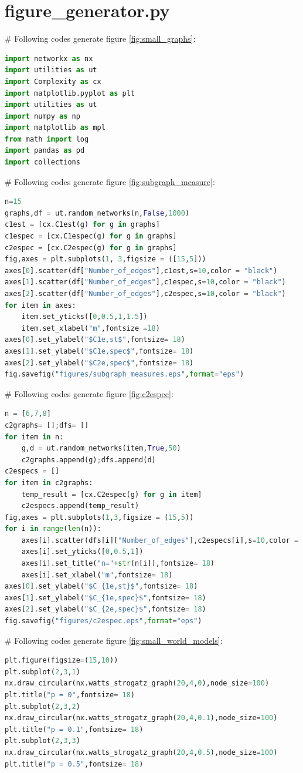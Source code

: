 \documentclass[12pt]{article}
\begin{document}
{\section{figure\_generator.py}
\label{figure_generator}
\# Following codes generate figure \ref{fig:small_graphs}:
\begin{lstlisting}[breaklines=true,language=Python]
import networkx as nx
import utilities as ut
import Complexity as cx
import matplotlib.pyplot as plt
import utilities as ut
import numpy as np
import matplotlib as mpl
from math import log
import pandas as pd
import collections
\end{lstlisting}
\noindent
\newline
\# Following codes generate figure \ref{fig:subgraph_measure}:
\begin{lstlisting}[breaklines=true,language=Python]
n=15
graphs,df = ut.random_networks(n,False,1000)
c1est = [cx.C1est(g) for g in graphs]
c1espec = [cx.C1espec(g) for g in graphs]
c2espec = [cx.C2espec(g) for g in graphs]
fig,axes = plt.subplots(1, 3,figsize = ([15,5]))
axes[0].scatter(df["Number_of_edges"],c1est,s=10,color = "black")
axes[1].scatter(df["Number_of_edges"],c1espec,s=10,color = "black")
axes[2].scatter(df["Number_of_edges"],c2espec,s=10,color = "black")
for item in axes:
    item.set_yticks([0,0.5,1,1.5])
    item.set_xlabel("m",fontsize =18)
axes[0].set_ylabel("$C1e,st$",fontsize= 18)
axes[1].set_ylabel("$C1e,spec$",fontsize= 18)
axes[2].set_ylabel("$C2e,spec$",fontsize= 18)
fig.savefig("figures/subgraph_measures.eps",format="eps")
\end{lstlisting}
\noindent
\newline
\# Following codes generate figure \ref{fig:c2espec}:
\begin{lstlisting}[breaklines=true,language=Python]
n = [6,7,8]
c2graphs= [];dfs= []
for item in n:
    g,d = ut.random_networks(item,True,50)
    c2graphs.append(g);dfs.append(d)
c2especs = []
for item in c2graphs:
    temp_result = [cx.C2espec(g) for g in item]
    c2especs.append(temp_result)
fig,axes = plt.subplots(1,3,figsize = (15,5))
for i in range(len(n)):
    axes[i].scatter(dfs[i]["Number_of_edges"],c2especs[i],s=10,color = "black")
    axes[i].set_yticks([0,0.5,1])
    axes[i].set_title("n="+str(n[i]),fontsize= 18)
    axes[i].set_xlabel("m",fontsize= 18)
axes[0].set_ylabel("$C_{1e,st}$",fontsize= 18)
axes[1].set_ylabel("$C_{1e,spec}$",fontsize= 18)
axes[2].set_ylabel("$C_{2e,spec}$",fontsize= 18)
fig.savefig("figures/c2espec.eps",format="eps")
\end{lstlisting}
\noindent
\newline
\# Following codes generate figure \ref{fig:small_world_models}:
\begin{lstlisting}[breaklines=true,language=Python]
plt.figure(figsize=(15,10))
plt.subplot(2,3,1)
nx.draw_circular(nx.watts_strogatz_graph(20,4,0),node_size=100)
plt.title("p = 0",fontsize= 18)
plt.subplot(2,3,2)
nx.draw_circular(nx.watts_strogatz_graph(20,4,0.1),node_size=100)
plt.title("p = 0.1",fontsize= 18)
plt.subplot(2,3,3)
nx.draw_circular(nx.watts_strogatz_graph(20,4,0.5),node_size=100)
plt.title("p = 0.5",fontsize= 18)


\end{lstlisting}}
\end{document}
